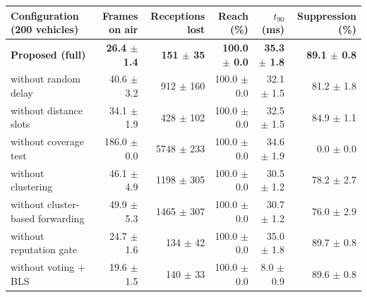 \footnotesize
\renewcommand{\arraystretch}{1.2}
\begin{tabular}{lrrrrr}
\toprule
Configuration (200 vehicles) & Frames on air & Receptions lost & Reach (\%) & $t_{90}$ (ms) & Suppression (\%) \\
\midrule
\textbf{Proposed (full)} & \textbf{26.4 $\pm$ 1.4} & \textbf{151 $\pm$ 35} & \textbf{100.0 $\pm$ 0.0} & \textbf{35.3 $\pm$ 1.8} & \textbf{89.1 $\pm$ 0.8} \\
without random delay & 40.6 $\pm$ 3.2 & 912 $\pm$ 160 & 100.0 $\pm$ 0.0 & 32.1 $\pm$ 1.5 & 81.2 $\pm$ 1.8 \\
without distance slots & 34.1 $\pm$ 1.9 & 428 $\pm$ 102 & 100.0 $\pm$ 0.0 & 32.5 $\pm$ 1.5 & 84.9 $\pm$ 1.1 \\
without coverage test & 186.0 $\pm$ 0.0 & 5748 $\pm$ 233 & 100.0 $\pm$ 0.0 & 34.6 $\pm$ 1.9 & 0.0 $\pm$ 0.0 \\
without clustering & 46.1 $\pm$ 4.9 & 1198 $\pm$ 305 & 100.0 $\pm$ 0.0 & 30.5 $\pm$ 1.2 & 78.2 $\pm$ 2.7 \\
without cluster-based forwarding & 49.9 $\pm$ 5.3 & 1465 $\pm$ 307 & 100.0 $\pm$ 0.0 & 30.7 $\pm$ 1.2 & 76.0 $\pm$ 2.9 \\
without reputation gate & 24.7 $\pm$ 1.6 & 134 $\pm$ 42 & 100.0 $\pm$ 0.0 & 35.0 $\pm$ 1.8 & 89.7 $\pm$ 0.8 \\
without voting + BLS & 19.6 $\pm$ 1.5 & 140 $\pm$ 33 & 100.0 $\pm$ 0.0 & 8.0 $\pm$ 0.9 & 89.6 $\pm$ 0.8 \\
\bottomrule
\end{tabular}

